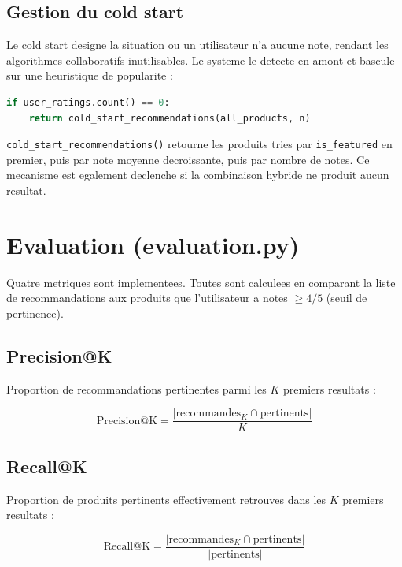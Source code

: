 \documentclass[12pt,a4paper]{report}
\newcommand{\fonction}[1]{\texttt{#1()}}
\newcommand{\var}[1]{\texttt{#1}}
\begin{document}
\subsection{Gestion du cold start}

Le cold start designe la situation ou un utilisateur n'a aucune note,
rendant les algorithmes collaboratifs inutilisables. Le systeme le detecte
en amont et bascule sur une heuristique de popularite :

\begin{lstlisting}[language=Python,caption={Gestion du cold start}]
if user_ratings.count() == 0:
    return cold_start_recommendations(all_products, n)
\end{lstlisting}

\fonction{cold\_start\_recommendations} retourne les produits tries par
\var{is\_featured} en premier, puis par note moyenne decroissante, puis par
nombre de notes. Ce mecanisme est egalement declenche si la combinaison hybride
ne produit aucun resultat.

\section{Evaluation (evaluation.py)}

Quatre metriques sont implementees. Toutes sont calculees en comparant la liste
de recommandations aux produits que l'utilisateur a notes $\geq 4/5$ (seuil de
pertinence).

\subsection{Precision@K}

Proportion de recommandations pertinentes parmi les $K$ premiers resultats :

\begin{equation}
\text{Precision@K} = \frac{|\text{recommandes}_{K} \cap \text{pertinents}|}{K}
\end{equation}

\subsection{Recall@K}

Proportion de produits pertinents effectivement retrouves dans les $K$ premiers
resultats :

\begin{equation}
\text{Recall@K} = \frac{|\text{recommandes}_{K} \cap \text{pertinents}|}{|\text{pertinents}|}
\end{equation}
\end{document}
